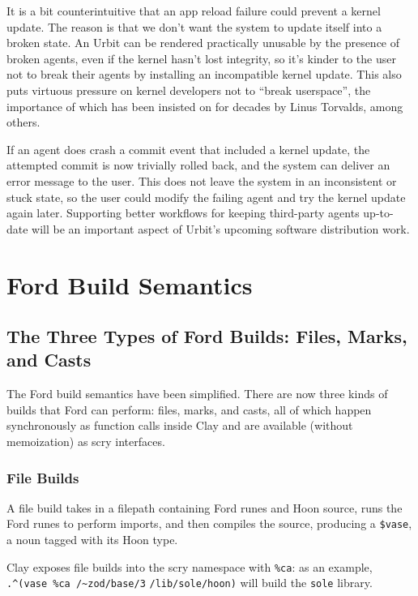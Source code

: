 \documentclass[twoside]{article}
\begin{document}
It is a bit counterintuitive that an app reload failure could prevent a kernel update. The reason is that we don't want the system to update itself into a broken state. An Urbit can be rendered practically unusable by the presence of broken agents, even if the kernel hasn't lost integrity, so it's kinder to the user not to break their agents by installing an incompatible kernel update. This also puts virtuous pressure on kernel developers not to ``break userspace'', the importance of which has been insisted on for decades by Linus Torvalds, among others.

If an agent does crash a commit event that included a kernel update, the attempted commit is now trivially rolled back, and the system can deliver an error message to the user. This does not leave the system in an inconsistent or stuck state, so the user could modify the failing agent and try the kernel update again later. Supporting better workflows for keeping third-party agents up-to-date will be an important aspect of Urbit’s upcoming software distribution work.


\section{Ford Build Semantics}

\subsection{The Three Types of Ford Builds: Files, Marks, and Casts}

The Ford build semantics have been simplified. There are now three kinds of builds that Ford can perform: files, marks, and casts, all of which happen synchronously as function calls inside Clay and are available (without memoization) as scry interfaces.

\subsubsection{File Builds}

A file build takes in a filepath containing Ford runes and Hoon source, runs the Ford runes to perform imports, and then compiles the source, producing a \lstinline[style=inlinecode]{$vase}, a noun tagged with its Hoon type.

\sloppy
Clay exposes file builds into the scry \mbox{namespace} with \lstinline[style=inlinecode]{%ca}: as an example, \lstinline[style=inlinecode]{.^(vase %ca /~zod/base/3} \lstinline[style=inlinecode]{/lib/sole/hoon)} will build the \lstinline[style=inlinecode]{sole} library.
\end{document}

